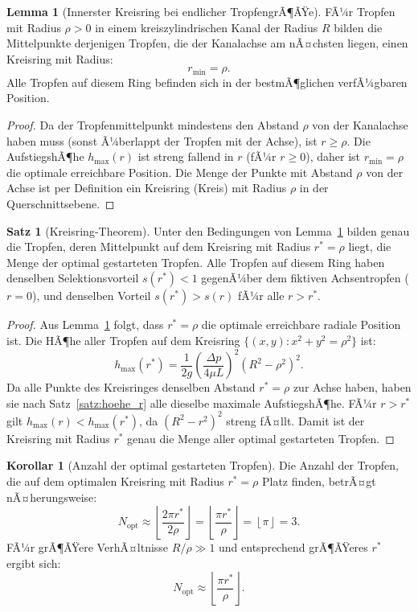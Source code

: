 ﻿\documentclass[a4paper,12pt]{article}
\theoremstyle{definition}
\newtheorem{satz}{Satz}
\newtheorem{lemma}{Lemma}
\newtheorem{korollar}{Korollar}
\begin{document}
\begin{lemma}[Innerster Kreisring bei endlicher TropfengrÃ¶ÃŸe]
\label{lem:ring}
    FÃ¼r Tropfen mit Radius $\rho > 0$ in einem kreiszylindrischen Kanal der Radius $R$
    bilden die Mittelpunkte derjenigen Tropfen, die der Kanalachse am nÃ¤chsten liegen,
    einen Kreisring mit Radius:
    \[
    r_{\min} = \rho.
    \]
    Alle Tropfen auf diesem Ring befinden sich in der bestmÃ¶glichen verfÃ¼gbaren Position.
\end{lemma}

\begin{proof}
    Da der Tropfenmittelpunkt mindestens den Abstand $\rho$ von der Kanalachse haben muss
    (sonst Ã¼berlappt der Tropfen mit der Achse), ist $r \ge \rho$. Die AufstiegshÃ¶he
    $h_{\max}(r)$ ist streng fallend in $r$ (fÃ¼r $r \ge 0$), daher ist $r_{\min} = \rho$
    die optimale erreichbare Position. Die Menge der Punkte mit Abstand $\rho$ von der
    Achse ist per Definition ein Kreisring (Kreis) mit Radius $\rho$ in der Querschnittsebene. \qedhere
\end{proof}

\begin{satz}[Kreisring-Theorem]
\label{satz:kreisring}
    Unter den Bedingungen von Lemma~\ref{lem:ring} bilden genau die Tropfen,
    deren Mittelpunkt auf dem Kreisring mit Radius $r^* = \rho$ liegt, die Menge der
    optimal gestarteten Tropfen. Alle Tropfen auf diesem Ring haben denselben
    Selektionsvorteil $s(r^*) < 1$ gegenÃ¼ber dem fiktiven Achsentropfen ($r = 0$),
    und denselben Vorteil $s(r^*) > s(r)$ fÃ¼r alle $r > r^*$.
\end{satz}

\begin{proof}
    Aus Lemma~\ref{lem:ring} folgt, dass $r^* = \rho$ die optimale erreichbare radiale
    Position ist. Die HÃ¶he aller Tropfen auf dem Kreisring $\{(x,y) : x^2+y^2 = \rho^2\}$
    ist:
    \[
    h_{\max}(r^*) = \frac{1}{2g}\left(\frac{\Delta p}{4\mu L}\right)^2 (R^2 - \rho^2)^2.
    \]
    Da alle Punkte des Kreisringes denselben Abstand $r^* = \rho$ zur Achse haben,
    haben sie nach Satz~\ref{satz:hoehe_r} alle dieselbe maximale AufstiegshÃ¶he.
    FÃ¼r $r > r^*$ gilt $h_{\max}(r) < h_{\max}(r^*)$, da $(R^2-r^2)^2$ streng fÃ¤llt.
    Damit ist der Kreisring mit Radius $r^*$ genau die Menge aller optimal gestarteten
    Tropfen. \qedhere
\end{proof}

\begin{korollar}[Anzahl der optimal gestarteten Tropfen]
    Die Anzahl der Tropfen, die auf dem optimalen Kreisring mit Radius $r^* = \rho$ Platz
    finden, betrÃ¤gt nÃ¤herungsweise:
    \[
    N_{\text{opt}} \approx \left\lfloor \frac{2\pi r^*}{2\rho} \right\rfloor
    = \left\lfloor \frac{\pi r^*}{\rho} \right\rfloor = \left\lfloor \pi \right\rfloor = 3.
    \]
    FÃ¼r grÃ¶ÃŸere VerhÃ¤ltnisse $R/\rho \gg 1$ und entsprechend grÃ¶ÃŸeres $r^*$ ergibt sich:
    \[
    N_{\text{opt}} \approx \left\lfloor \frac{\pi r^*}{\rho} \right\rfloor.
    \]
\end{korollar}
\end{document}
